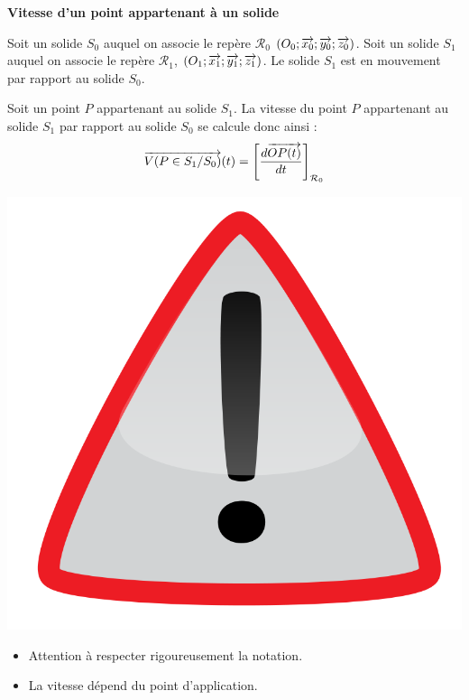 \documentclass[11pt,oneside]{article}
\begin{document}
\begin{defi}
\textbf{Vitesse d'un point appartenant à un solide}

Soit un solide $S_0$ auquel on associe le repère $\mathcal{R}_0$ $\left(O_0;\overrightarrow{x_0};\overrightarrow{y_0};\overrightarrow{z_0} \right)$.  Soit un solide $S_1$ auquel on associe le repère $\mathcal{R}_1$,  $\left(O_1;\overrightarrow{x_1};\overrightarrow{y_1};\overrightarrow{z_1} \right)$. Le solide $S_1$ est en mouvement par rapport au solide $S_0$. 

Soit un point $P$ appartenant au solide $S_1$. La vitesse du point $P$ appartenant au solide $S_1$ par rapport au solide $S_0$ se calcule donc ainsi : 
$$
\overrightarrow{V(P\in S_1/S_0)}(t) = \left[\dfrac{d\overrightarrow{OP(t)}}{dt}\right]_{\mathcal{R}_0}
$$
\end{defi}

\begin{warn}
\begin{minipage}[c]{.15\linewidth}
\begin{center}
\includegraphics[width=.8\textwidth]{png/warning3}
\end{center}
\end{minipage} \hfill
\begin{minipage}[c]{.8\linewidth}
\begin{itemize}
\item Attention à respecter rigoureusement la notation.
\item La vitesse dépend du point d'application.
\end{itemize}
\end{minipage}
\end{warn}
\end{document}
